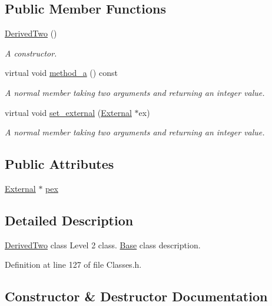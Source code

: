 \subsection*{Public Member Functions}
\begin{DoxyCompactItemize}
\item 
\hyperlink{class_derived_two_a9a3a078cc0cecad09409c8f812068b4c}{Derived\+Two} ()
\begin{DoxyCompactList}\small\item\em A constructor. \end{DoxyCompactList}\item 
virtual void \hyperlink{class_derived_two_ae83bc07728d0af09413c6eb91c840e1d}{method\+\_\+a} () const
\begin{DoxyCompactList}\small\item\em A normal member taking two arguments and returning an integer value. \end{DoxyCompactList}\item 
virtual void \hyperlink{class_derived_two_a84a5387e229abb415d74fb4ed8a5d913}{set\+\_\+external} (\hyperlink{class_external}{External} $\ast$ex)
\begin{DoxyCompactList}\small\item\em A normal member taking two arguments and returning an integer value. \end{DoxyCompactList}\end{DoxyCompactItemize}
\subsection*{Public Attributes}
\begin{DoxyCompactItemize}
\item 
\hyperlink{class_external}{External} $\ast$ \hyperlink{class_derived_two_a802d77367aae0f23c503def0befd6a88}{pex}
\end{DoxyCompactItemize}


\subsection{Detailed Description}
\hyperlink{class_derived_two}{Derived\+Two} class Level 2 class. \hyperlink{class_base}{Base} class description. 

Definition at line 127 of file Classes.\+h.



\subsection{Constructor \& Destructor Documentation}
\mbox{\label{class_derived_two_a9a3a078cc0cecad09409c8f812068b4c}} 
